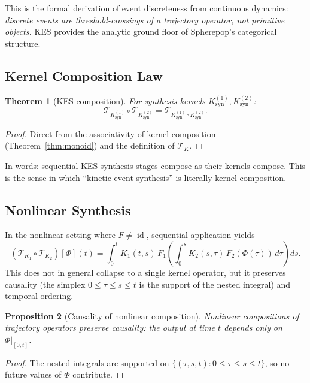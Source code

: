 \documentclass[12pt]{article}
\newtheorem{theorem}{Theorem}[section]
\newtheorem{proposition}[theorem]{Proposition}
\DeclareMathOperator{\id}{id}
\newcommand{\TK}{\mathcal{T}_K}
\begin{document}
This is the formal derivation of event discreteness from continuous dynamics:
\textit{discrete events are threshold-crossings of a trajectory operator,
not primitive objects.} KES provides the analytic ground floor of Spherepop's
categorical structure.

\subsection{Kernel Composition Law}

\begin{theorem}[KES composition]
\label{thm:kescomp}
For synthesis kernels $K^{(1)}_{\mathrm{syn}}, K^{(2)}_{\mathrm{syn}}$:
\[
  \mathcal{T}_{K^{(1)}_{\mathrm{syn}}}\circ\mathcal{T}_{K^{(2)}_{\mathrm{syn}}}
  = \mathcal{T}_{K^{(1)}_{\mathrm{syn}}\circ K^{(2)}_{\mathrm{syn}}}.
\]
\end{theorem}

\begin{proof}
Direct from the associativity of kernel composition (Theorem~\ref{thm:monoid})
and the definition of $\TK$.
\end{proof}

In words: sequential KES synthesis stages compose as their kernels compose.
This is the sense in which ``kinetic-event synthesis'' is literally kernel
composition.

\subsection{Nonlinear Synthesis}

In the nonlinear setting where $F \neq \id$, sequential application yields
\[
  (\mathcal{T}_{K_1}\circ\mathcal{T}_{K_2})[\Phi](t)
  = \int_0^t K_1(t,s)\,
    F_1\!\left(\int_0^s K_2(s,\tau)\,F_2(\Phi(\tau))\,d\tau\right) ds.
\]
This does not in general collapse to a single kernel operator, but it
preserves causality (the simplex $0 \leq \tau \leq s \leq t$ is the
support of the nested integral) and temporal ordering.

\begin{proposition}[Causality of nonlinear composition]
Nonlinear compositions of trajectory operators preserve causality:
the output at time $t$ depends only on $\Phi|_{[0,t]}$.
\end{proposition}

\begin{proof}
The nested integrals are supported on $\{(\tau, s, t): 0 \leq \tau \leq
s \leq t\}$, so no future values of $\Phi$ contribute.
\end{proof}
\end{document}
